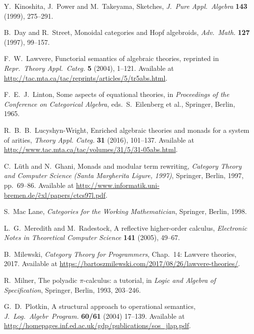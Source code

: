 \documentclass{amsart}
\theoremstyle{definition}
\begin{document}
\begin{thebibliography}{100}
 Y.\ Kinoshita, J.\ Power and M.\ Takeyama, Sketches,
\textsl{J.\ Pure Appl.\ Algebra} \textbf{143} (1999), 275--291.

 B.\ Day and R.\ Street, Monoidal categories and Hopf algebroids,
\textsl{Adv.\ Math.} \textbf{127} (1997), 99--157.

 F.\ W.\ Lawvere, Functorial semantics of algebraic theories, reprinted in
\textsl{Repr.\ Theory Appl.\ Categ.} \textbf{5} (2004), 1--121.  Available at \href{http://tac.mta.ca/tac/reprints/articles/5/tr5abs.html}{http://tac.mta.ca/tac/reprints/articles/5/tr5abs.html}.

 F.\ E.\ J.\ Linton, Some aspects of equational theories, in 
\textsl{Proceedings of the Conference on Categorical Algebra}, eds.\ S.\ Eilenberg et al.,
Springer, Berlin, 1965.

 R.\ B.\ B.\ Lucyshyn-Wright, Enriched algebraic theories and monads for a system of arities, \textsl{Theory Appl. Categ.} \textbf{31} (2016), 101--137.  Available at \href{http://www.tac.mta.ca/tac/volumes/31/5/31-05abs.html}{http://www.tac.mta.ca/tac/volumes/31/5/31-05abs.html}.
	
 C.\ L\"{u}th and N.\ Ghani, Monads and modular term rewriting,
\textsl{Category Theory and Computer Science ({S}anta {M}argherita Ligure, 1997)}, Springer, Berlin, 1997, pp.\ 69--86.  Available at \href{http://www.informatik.uni-bremen.de/~cxl/papers/ctcs97l.pdf}{http://www.informatik.uni-bremen.de/\~cxl/papers/ctcs97l.pdf}.

 S.\ Mac Lane, \textsl{Categories for the Working Mathematician}, Springer, Berlin, 1998.  

    
 L.\ G.\ Meredith and M.\ Radestock, A reflective higher-order calculus,
\textsl{Electronic Notes in Theoretical Computer Science} \textbf{141} (2005), 49--67.

 B.\ Milewski, \textsl{Category Theory for Programmers}, Chap.\ 14: Lawvere theories, 2017.   Available at \href{https://bartoszmilewskiski.com/2017/08/26/lawvere-theories/}{https://bartoszmilewski.com/2017/08/26/lawvere-theories/}.

 R.\ Milner, The polyadic {$\pi$}-calculus: a tutorial, in \textsl{Logic and Algebra of Specification}, Springer, Berlin, 1993, 203--246.

 G.\ D.\ Plotkin, A structural approach to operational semantics, \textsl{J.\ Log.\ Algebr\ Program.} \textbf{60/61} (2004) 17--139.  Available at \href{http://homepages.inf.ed.ac.uk/gdp/publications/sos_jlap.pdf}{http://homepages.inf.ed.ac.uk/gdp/publications/sos\_jlap.pdf}.


\end{thebibliography}
\end{document}
